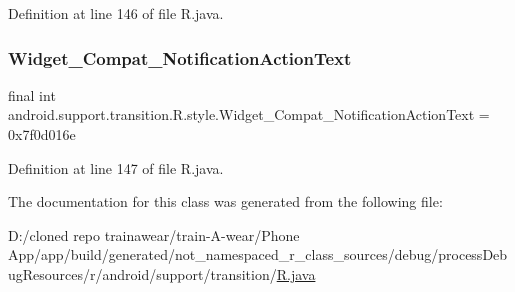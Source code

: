 Definition at line 146 of file R.\+java.

\mbox{\label{classandroid_1_1support_1_1transition_1_1_r_1_1style_af434cc5b5905a9b477e4ba7fb6c0ba54}} 
\subsubsection{\texorpdfstring{Widget\_Compat\_NotificationActionText}{Widget\_Compat\_NotificationActionText}}
{\footnotesize\ttfamily final int android.\+support.\+transition.\+R.\+style.\+Widget\+\_\+\+Compat\+\_\+\+Notification\+Action\+Text = 0x7f0d016e\hspace{0.3cm}{\ttfamily [static]}}



Definition at line 147 of file R.\+java.



The documentation for this class was generated from the following file\+:\begin{DoxyCompactItemize}
\item 
D\+:/cloned repo trainawear/train-\/\+A-\/wear/\+Phone App/app/build/generated/not\+\_\+namespaced\+\_\+r\+\_\+class\+\_\+sources/debug/process\+Debug\+Resources/r/android/support/transition/\mbox{\hyperlink{process_debug_resources_2r_2android_2support_2transition_2_r_8java}{R.\+java}}\end{DoxyCompactItemize}
